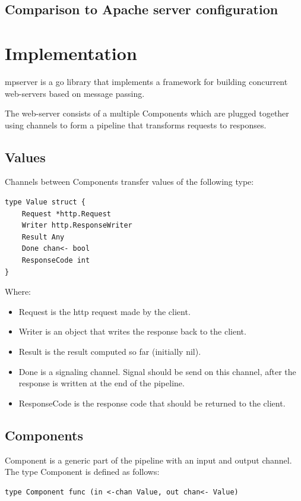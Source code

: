 \documentclass[12pt,a4paper]{article}
\begin{document}
\subsection{Comparison to Apache server configuration}


\newpage
\section{Implementation}

mpserver is a go library that implements a framework for building 
concurrent web-servers based on message passing.

The web-server consists of a multiple Components which are plugged 
together using channels to form a pipeline that transforms requests 
to responses.

\subsection{Values} 
Channels between Components transfer values of the following type:

\begin{lstlisting}
type Value struct {
    Request *http.Request
    Writer http.ResponseWriter
    Result Any
    Done chan<- bool
    ResponseCode int
}
\end{lstlisting}
Where:
\begin{itemize}
  \item Request is the http request made by the client.
  \item Writer is an object that writes the response back to the 	client.
  \item Result is the result computed so far (initially nil).
  \item Done is a signaling channel. Signal should be send on this channel,
		after the response is written at the end of the pipeline.
  \item ResponseCode is the response code that should be returned to the client.
\end{itemize}

\subsection{Components}
Component is a generic part of the pipeline with an input and output channel.
The type Component is defined as follows:

\begin{lstlisting}
type Component func (in <-chan Value, out chan<- Value)
\end{lstlisting}
\end{document}
